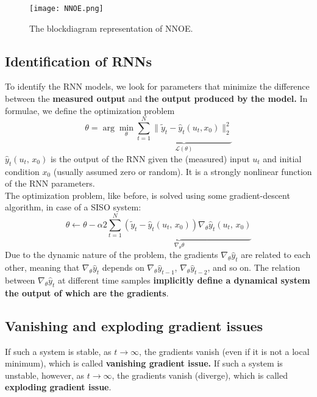 \begin{figure}[H]
    \centering \texttt{[image: NNOE.png]}
    \caption{The blockdiagram representation of NNOE.}
 \end{figure}

\subsection{Identification of RNNs}
To identify the RNN models, we look for parameters that minimize the difference between the \textbf{measured output } and \textbf{the output produced by the model.} In formulae, we define the optimization problem
\[
\theta  = \arg\min\limits_{\theta} 
\underbrace{
\sum_{t=1}^{N} \|\tilde{y}_t -\hat{y}_t(u_t,x_0)\|_2^2}_{\mathcal{L}(\theta)}
\]
$\hat{y}_t(u_t,\,x_0)$ is the output of the RNN given the (measured) input $u_t$ and initial condition $x_0$ (usually assumed zero or random). It is a strongly nonlinear function of the RNN parameters.\\

The optimization problem, like before, is solved using some gradient-descent algorithm, in case of a SISO system:
\[
\theta \gets \theta - \alpha 2 \underbrace{\sum\limits_{t=1}^{N}(\tilde{y}_t - \hat{y}_t(u_t,\,x_0))\nabla_\theta\hat{y}_t(u_t,\,x_0)}_{\nabla_\theta \mathcal{\theta}}
\]
Due to the dynamic nature of the problem, the gradients $\nabla_\theta \hat{y}_t$ are related to each other, meaning that $\nabla_\theta \hat{y}_t$ depends on $\nabla_\theta \hat{y}_{t-1}$, $\nabla_\theta \hat{y}_{t-2}$, and so on. The relation between $\nabla_\theta \hat{y}_t$ at different time samples \textbf{implicitly define a dynamical system the output of which are the gradients}.

\subsection{Vanishing and exploding gradient issues}
If such a system is stable, as $t \to \infty$, the gradients vanish (even if it is not a local minimum), which is called \textbf{vanishing gradient issue.} If such a system is unstable, however, as $t \to \infty$, the gradients vanish (diverge), which is called \textbf{exploding gradient issue}. 

